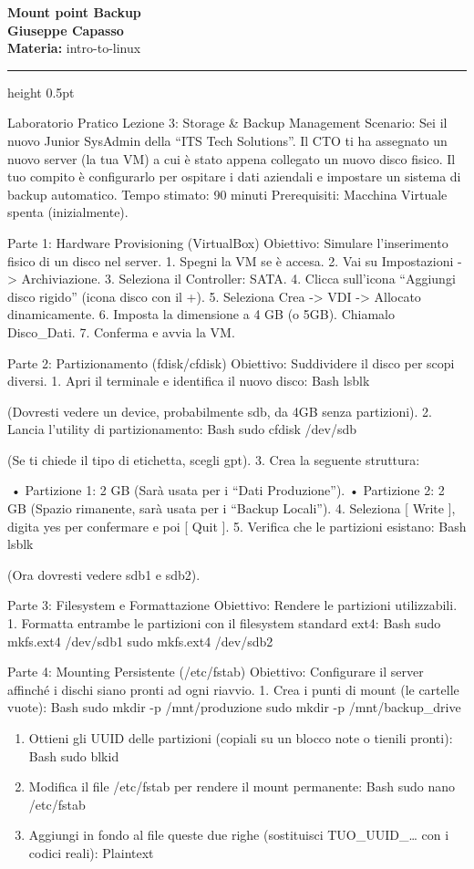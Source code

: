 \documentclass[11pt,a4paper]{article}
\newcommand{\proposaltitle}[1]{
    \begin{center}
        \vspace*{0.1cm}
        {\LARGE \bfseries \color{blue} #1} \\[1.5ex]
        {\large \textbf{Giuseppe Capasso}} \\[1ex]
                \small{
            \vspace{0.1cm}
            \textbf{Materia:} intro-to-linux\\
        }
            \end{center}
    \vspace{0.3cm}
    \hrule height 0.5pt
    \vspace{0.5cm}
}
\begin{document}
\proposaltitle{Mount point Backup}

Laboratorio Pratico Lezione 3: Storage \& Backup Management Scenario:
Sei il nuovo Junior SysAdmin della ``ITS Tech Solutions''. Il CTO ti ha
assegnato un nuovo server (la tua VM) a cui è stato appena collegato un
nuovo disco fisico. Il tuo compito è configurarlo per ospitare i dati
aziendali e impostare un sistema di backup automatico. Tempo stimato: 90
minuti Prerequisiti: Macchina Virtuale spenta (inizialmente).

Parte 1: Hardware Provisioning (VirtualBox) Obiettivo: Simulare
l'inserimento fisico di un disco nel server. 1. Spegni la VM se è
accesa. 2. Vai su Impostazioni -\textgreater{} Archiviazione. 3.
Seleziona il Controller: SATA. 4. Clicca sull'icona ``Aggiungi disco
rigido'' (icona disco con il +). 5. Seleziona Crea -\textgreater{} VDI
-\textgreater{} Allocato dinamicamente. 6. Imposta la dimensione a 4 GB
(o 5GB). Chiamalo Disco\_Dati. 7. Conferma e avvia la VM.

Parte 2: Partizionamento (fdisk/cfdisk) Obiettivo: Suddividere il disco
per scopi diversi. 1. Apri il terminale e identifica il nuovo disco:
Bash lsblk

(Dovresti vedere un device, probabilmente sdb, da 4GB senza partizioni).
2. Lancia l'utility di partizionamento: Bash sudo cfdisk /dev/sdb

(Se ti chiede il tipo di etichetta, scegli gpt). 3. Crea la seguente
struttura:

• Partizione 1: 2 GB (Sarà usata per i ``Dati Produzione''). •
Partizione 2: 2 GB (Spazio rimanente, sarà usata per i ``Backup
Locali''). 4. Seleziona {[} Write {]}, digita yes per confermare e poi
{[} Quit {]}. 5. Verifica che le partizioni esistano: Bash lsblk

(Ora dovresti vedere sdb1 e sdb2).

Parte 3: Filesystem e Formattazione Obiettivo: Rendere le partizioni
utilizzabili. 1. Formatta entrambe le partizioni con il filesystem
standard ext4: Bash sudo mkfs.ext4 /dev/sdb1 sudo mkfs.ext4 /dev/sdb2

Parte 4: Mounting Persistente (/etc/fstab) Obiettivo: Configurare il
server affinché i dischi siano pronti ad ogni riavvio. 1. Crea i punti
di mount (le cartelle vuote): Bash sudo mkdir -p /mnt/produzione sudo
mkdir -p /mnt/backup\_drive

\begin{enumerate}
\def\labelenumi{\arabic{enumi}.}
\setcounter{enumi}{1}
\item
  Ottieni gli UUID delle partizioni (copiali su un blocco note o tienili
  pronti): Bash sudo blkid
\item
  Modifica il file /etc/fstab per rendere il mount permanente: Bash sudo
  nano /etc/fstab
\item
  Aggiungi in fondo al file queste due righe (sostituisci
  TUO\_UUID\_\ldots{} con i codici reali): Plaintext
\end{enumerate}
\end{document}
